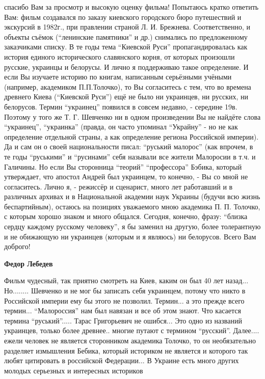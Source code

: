 \begin{itemize}
\begin{itemize}
спасибо Вам за просмотр и высокую оценку фильма! Попытаюсь кратко ответить Вам:
фильм создавался по заказу киевского городского бюро путешествий и экскурсий в
1982г., при правлении страной Л. И. Брежнева. Соответственно, и объекты съёмок
(\enquote{ленинские памятники} и др.) снимались по предложенному заказчиками
списку. В те годы тема \enquote{Киевской Руси} пропагандировалась как история
единого исторического славянского корня, от которых произошли русские, украинцы
и белорусы. И лично я поддерживаю такое определение. И если Вы изучаете историю
по книгам, написанным серьёзными учёными (например, академиком П.П.Толочко), то
Вы согласитесь с тем, что во времена древнего Киева (\enquote{Киевской Руси})
ещё не было ни украинцев, ни русских, ни белорусов. Термин \enquote{украинец} появился
в совсем недавно, - середине 19в. Поэтому у того же Т. Г. Шевченко ни в одном
произведении Вы не найдёте слова \enquote{украинец}, \enquote{украинка}
(правда, он часто упоминал \enquote{Украйну} - но не как определение отдельной
страны, а как определение региона Российской империи). Да и сам он о своей
национальности писал: \enquote{руський малорос} (как впрочем, в те годы
\enquote{руськими} и \enquote{русинами} себя называли все жители Малоросии в
т.ч. и Галичины. Но если Вы сторонница \enquote{теорий} \enquote{профессора}
Бэбика, который утверждает, что апостол Андрей был украинцем, то конечно, - Вы
со мной не согласитесь. Лично я, - режиссёр и сценарист, много лет работавший и
в различных архивах и в Национальной академии наук Украины (будучи всю жизнь
беспартийным), остаюсь на позициях уважаемого мною академика П. П. Толочко, с
которым хорошо знаком и много общался. Сегодня, конечно, фразу: \enquote{близка
сердцу каждому русскому человеку}, я бы заменил на другую, более толерантную и
не обижающую ни украинцев (которым и я являюсь) ни белорусов. Всего Вам
доброго!

\begin{itemize} %
\textbf{Федор Лебедев}

Фильм чудесный, так приятно смотреть на Киев, каким он был 40 лет
назад... Но........ Шевченко и не мог бы записать себя украинцем, потому что
никто в Российской империи ему бы этого не позволил. Термин... а это прежде всего
термин... \enquote{Малороссия} нам был навязан и все об этом знают. Что касается термина
\enquote{руський}..... Тарас Григорьевич не ошибся... Это одно из названий украинцев,
только более древнее.. многие путают с термином \enquote{русский}. Далее.... ежели
человек не является сторонником академика Толочко, то он необязательно
разделяет измышления Бебика, который историком не является и которого так любят
цитировать в российской Федерации... В Украине есть много других молодых
серьезных и интересных историков


\end{itemize}
\end{itemize}
\end{itemize}
